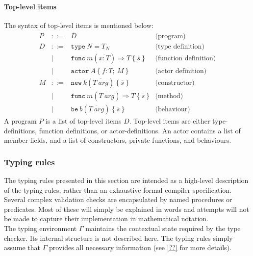 \documentclass[a4paper,12pt,fleqn]{article}
\begin{document}
\paragraph{Top-level items\\}
The syntax of top-level items is mentioned below:
\[
\begin{array}{lcll}
P & ::= & \overline{D} & \text{(program)} \\[0.5em]
D & ::= & \mathtt{type}\ N = T_N & \text{(type definition)} \\
  & \mid & \mathtt{func}\ m(\overline{x : T}) \Rightarrow T\ \{\ \overline{s}\ \} & \text{(function definition)} \\
  & \mid & \mathtt{actor}\ A\ \{\ \overline{f : T};\ \overline{M}\ \} & \text{(actor definition)} \\[0.5em]
M & ::= & \mathtt{new}\ k(\overline{T\ \mathit{arg}})\ \{\ \overline{s}\ \} & \text{(constructor)} \\
  & \mid & \mathtt{func}\ m(\overline{T\ \mathit{arg}}) \Rightarrow T\ \{\ \overline{s}\ \} & \text{(method)} \\
  & \mid & \mathtt{be}\ b(\overline{T\ \mathit{arg}})\ \{\ \overline{s}\ \} & \text{(behaviour)}
\end{array}
\]
A program $P$ is a list of top-level items $D$. Top-level items are either type-definitions, function definitions, or actor-definitions. An actor contains a list of member fields, and a list of constructors, private functions, and behaviours.

\subsubsection{Typing rules}
The typing rules presented in this section are intended as a high-level description of the typing rules, rather than an exhaustive formal compiler specification. Several complex validation checks are encapsulated by named procedures or predicates. Most of these will simply be explained in words and attempts will not be made to capture their implementation in mathematical notation.\\
The typing environment $\Gamma$ maintains the contextual state required by the type checker. Its internal structure is not described here. The typing rules simply assume that $\Gamma$ provides all necessary information (see \ref{??} for more details).
\end{document}
